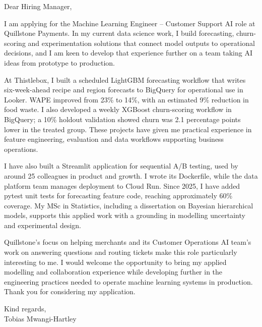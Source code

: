 \documentclass[11pt,a4paper]{article}
\begin{document}
Dear Hiring Manager,

I am applying for the Machine Learning Engineer -- Customer Support AI role at Quillstone Payments. In my current data science work, I build forecasting, churn-scoring and experimentation solutions that connect model outputs to operational decisions, and I am keen to develop that experience further on a team taking AI ideas from prototype to production.

At Thistlebox, I built a scheduled LightGBM forecasting workflow that writes six-week-ahead recipe and region forecasts to BigQuery for operational use in Looker. WAPE improved from 23\% to 14\%, with an estimated 9\% reduction in food waste. I also developed a weekly XGBoost churn-scoring workflow in BigQuery; a 10\% holdout validation showed churn was 2.1 percentage points lower in the treated group. These projects have given me practical experience in feature engineering, evaluation and data workflows supporting business operations.

I have also built a Streamlit application for sequential A/B testing, used by around 25 colleagues in product and growth. I wrote its Dockerfile, while the data platform team manages deployment to Cloud Run. Since 2025, I have added pytest unit tests for forecasting feature code, reaching approximately 60\% coverage. My MSc in Statistics, including a dissertation on Bayesian hierarchical models, supports this applied work with a grounding in modelling uncertainty and experimental design.

Quillstone’s focus on helping merchants and its Customer Operations AI team’s work on answering questions and routing tickets make this role particularly interesting to me. I would welcome the opportunity to bring my applied modelling and collaboration experience while developing further in the engineering practices needed to operate machine learning systems in production. Thank you for considering my application.

Kind regards,\\
Tobias Mwangi-Hartley
\end{document}
